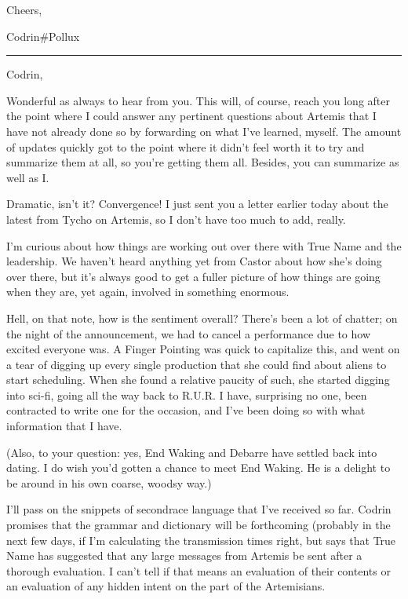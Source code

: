 Cheers,

Codrin\#Pollux

\begin{center}\rule{0.5\linewidth}{0.5pt}\end{center}

Codrin,

Wonderful as always to hear from you. This will, of course, reach you long after the point where I could answer any pertinent questions about Artemis that I have not already done so by forwarding on what I've learned, myself. The amount of updates quickly got to the point where it didn't feel worth it to try and summarize them at all, so you're getting them all. Besides, you can summarize as well as I.

Dramatic, isn't it? Convergence! I just sent you a letter earlier today about the latest from Tycho on Artemis, so I don't have too much to add, really.

I'm curious about how things are working out over there with True Name and the leadership. We haven't heard anything yet from Castor about how she's doing over there, but it's always good to get a fuller picture of how things are going when they are, yet again, involved in something enormous.

Hell, on that note, how is the sentiment overall? There's been a lot of chatter; on the night of the announcement, we had to cancel a performance due to how excited everyone was. A Finger Pointing was quick to capitalize this, and went on a tear of digging up every single production that she could find about aliens to start scheduling. When she found a relative paucity of such, she started digging into sci-fi, going all the way back to R.U.R. I have, surprising no one, been contracted to write one for the occasion, and I've been doing so with what information that I have.

(Also, to your question: yes, End Waking and Debarre have settled back into dating. I do wish you'd gotten a chance to meet End Waking. He is a delight to be around in his own coarse, woodsy way.)


I'll pass on the snippets of secondrace language that I've received so far. Codrin promises that the grammar and dictionary will be forthcoming (probably in the next few days, if I'm calculating the transmission times right, but says that True Name has suggested that any large messages from Artemis be sent after a thorough evaluation. I can't tell if that means an evaluation of their contents or an evaluation of any hidden intent on the part of the Artemisians.

